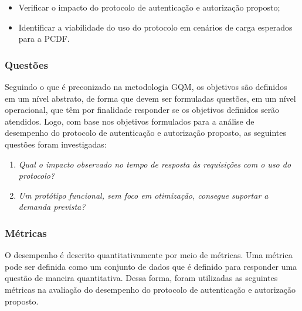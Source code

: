 \begin{itemize}
\item Verificar o impacto do protocolo de autenticação e autorização proposto;
\item Identificar a viabilidade do uso do protocolo em cen\'{a}rios de carga esperados para a PCDF.
\end{itemize}


\subsubsection{Questões}\label{sec:gqmquestoes}

Seguindo o que é preconizado na metodologia GQM, os objetivos são definidos em um nível abstrato, de forma que devem ser formuladas questões, em um nível operacional, que têm por finalidade responder se os objetivos definidos serão atendidos. Logo, com base nos objetivos formulados para a análise de desempenho do protocolo de autenticação e autorização 
proposto, as seguintes questões foram investigadas:

\parbox{0.8\textwidth}{
\begin{enumerate}[(Q1)]
\item \emph{Qual o impacto observado no tempo de resposta às requisições com o uso do protocolo?}
\item \emph{Um protótipo funcional, sem foco em otimização, consegue suportar a demanda prevista?}
\end{enumerate}}

\subsubsection{Métricas}

O desempenho é descrito quantitativamente por meio de métricas. Uma métrica pode ser definida como um conjunto de dados que é definido para responder uma questão de maneira quantitativa. Dessa forma, foram utilizadas as seguintes métricas na avaliação do desempenho do protocolo de autenticação e autorização proposto. 

